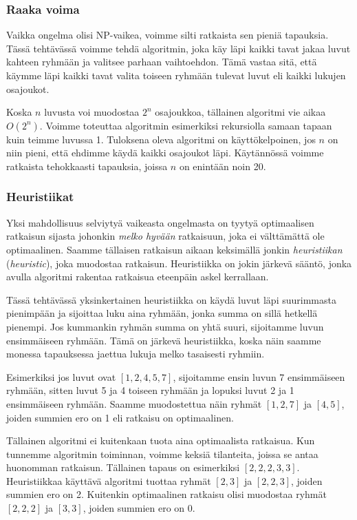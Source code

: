 \subsubsection{Raaka voima}

Vaikka ongelma olisi NP-vaikea, voimme silti ratkaista sen
pieniä tapauksia.
Tässä tehtävässä voimme tehdä algoritmin,
joka käy läpi kaikki tavat jakaa luvut kahteen ryhmään
ja valitsee parhaan vaihtoehdon.
Tämä vastaa sitä, että käymme läpi kaikki tavat valita
toiseen ryhmään tulevat luvut
eli kaikki lukujen osajoukot.

Koska $n$ luvusta voi muodostaa $2^n$ osajoukkoa,
tällainen algoritmi vie aikaa $O(2^n)$.
Voimme toteuttaa algoritmin esimerkiksi rekursiolla
samaan tapaan kuin teimme luvussa 1.
Tuloksena oleva algoritmi on käyttökelpoinen, jos $n$ on niin pieni,
että ehdimme käydä kaikki osajoukot läpi.
Käytännössä voimme ratkaista tehokkaasti tapauksia,
joissa $n$ on enintään noin 20.

\subsubsection{Heuristiikat}


Yksi mahdollisuus selviytyä vaikeasta ongelmasta on tyytyä
optimaalisen ratkaisun sijasta johonkin \emph{melko hyvään} ratkaisuun,
joka ei välttämättä ole optimaalinen.
Saamme tällaisen ratkaisun aikaan keksimällä jonkin
\emph{heuristiikan} (\emph{heuristic}), joka muodostaa ratkaisun.
Heuristiikka on jokin järkevä sääntö, jonka avulla
algoritmi rakentaa ratkaisua eteenpäin askel kerrallaan.

Tässä tehtävässä yksinkertainen heuristiikka on
käydä luvut läpi suurimmasta pienimpään ja sijoittaa
luku aina ryhmään, jonka summa on sillä hetkellä pienempi.
Jos kummankin ryhmän summa on yhtä suuri,
sijoitamme luvun ensimmäiseen ryhmään.
Tämä on järkevä heuristiikka, koska näin saamme monessa tapauksessa
jaettua lukuja melko tasaisesti ryhmiin.

Esimerkiksi jos luvut ovat $[1,2,4,5,7]$, sijoitamme ensin
luvun 7 ensim\-mäiseen ryhmään, sitten luvut 5 ja 4 toiseen ryhmään
ja lopuksi luvut 2 ja 1 ensimmäiseen ryhmään.
Saamme muodostettua näin ryhmät $[1,2,7]$ ja $[4,5]$,
joiden summien ero on 1 eli ratkaisu on optimaalinen.

Tällainen algoritmi ei kuitenkaan tuota aina optimaalista ratkaisua.
Kun tunnemme algoritmin toiminnan, voimme keksiä tilanteita,
joissa se antaa huonomman ratkaisun.
Tällainen tapaus on esimerkiksi $[2,2,2,3,3]$.
Heuristiikkaa käyttävä algoritmi tuottaa ryhmät $[2,3]$ ja $[2,2,3]$,
joiden summien ero on 2.
Kuitenkin optimaalinen ratkaisu olisi muodostaa ryhmät
$[2,2,2]$ ja $[3,3]$, joiden summien ero on 0.

